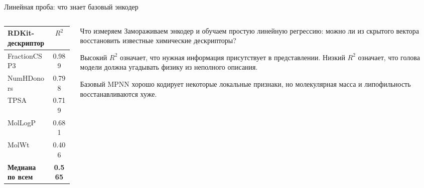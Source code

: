 \documentclass[aspectratio=169,10pt]{beamer}
\newcommand{\smallnote}[1]{{\scriptsize\color{TGSlate}#1}}
\begin{document}
\begin{frame}{Линейная проба: что знает базовый энкодер}
  \small
  \begin{columns}[T,onlytextwidth]
    \begin{column}{0.46\textwidth}
      \centering
      \scriptsize
      \setlength{\tabcolsep}{5pt}
      \begin{tabular}{lc}
        \toprule
        \textbf{RDKit-дескриптор} & \textbf{$R^2$}\\
        \midrule
        FractionCSP3 & 0.989\\
        NumHDonors & 0.798\\
        TPSA & 0.719\\
        MolLogP & 0.681\\
        MolWt & 0.406\\
        \midrule
        \textbf{Медиана по всем} & \textbf{0.565}\\
        \bottomrule
      \end{tabular}
    \end{column}
    \begin{column}{0.50\textwidth}
      \begin{block}{Что измеряем}
        \scriptsize
        Замораживаем энкодер и обучаем простую линейную регрессию:
        можно ли из скрытого вектора восстановить известные химические
        дескрипторы?

        \vspace{0.35em}
        Высокий $R^2$ означает, что нужная информация присутствует
        в представлении. Низкий $R^2$ означает, что голова модели
        должна угадывать физику из неполного описания.
      \end{block}
      \smallnote{Базовый MPNN хорошо кодирует некоторые локальные признаки, но молекулярная масса и липофильность восстанавливаются хуже.}
    \end{column}
  \end{columns}
\end{frame}
\end{document}
